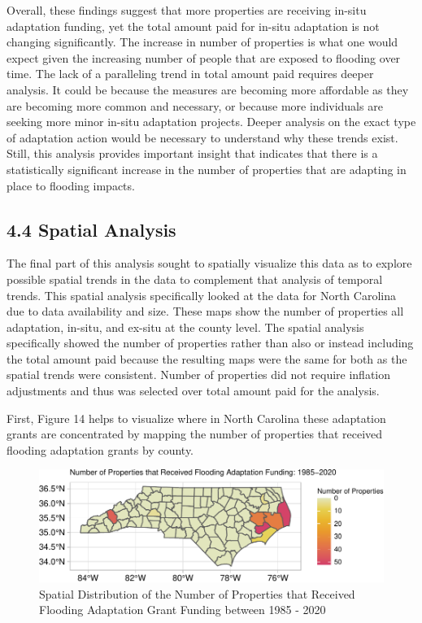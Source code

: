 \documentclass[
  12pt,
]{article}
\begin{document}
Overall, these findings suggest that more properties are receiving
in-situ adaptation funding, yet the total amount paid for in-situ
adaptation is not changing significantly. The increase in number of
properties is what one would expect given the increasing number of
people that are exposed to flooding over time. The lack of a paralleling
trend in total amount paid requires deeper analysis. It could be because
the measures are becoming more affordable as they are becoming more
common and necessary, or because more individuals are seeking more minor
in-situ adaptation projects. Deeper analysis on the exact type of
adaptation action would be necessary to understand why these trends
exist. Still, this analysis provides important insight that indicates
that there is a statistically significant increase in the number of
properties that are adapting in place to flooding impacts.

\hypertarget{spatial-analysis}{%
\subsection{4.4 Spatial Analysis}\label{spatial-analysis}}

The final part of this analysis sought to spatially visualize this data
as to explore possible spatial trends in the data to complement that
analysis of temporal trends. This spatial analysis specifically looked
at the data for North Carolina due to data availability and size. These
maps show the number of properties all adaptation, in-situ, and ex-situ
at the county level. The spatial analysis specifically showed the number
of properties rather than also or instead including the total amount
paid because the resulting maps were the same for both as the spatial
trends were consistent. Number of properties did not require inflation
adjustments and thus was selected over total amount paid for the
analysis.

First, Figure 14 helps to visualize where in North Carolina these
adaptation grants are concentrated by mapping the number of properties
that received flooding adaptation grants by county. \newline

\begin{figure}
\centering
\includegraphics{finalreport_files/figure-latex/unnamed-chunk-25-1.pdf}
\caption{Spatial Distribution of the Number of Properties that Received
Flooding Adaptation Grant Funding between 1985 - 2020}
\end{figure}
\end{document}
